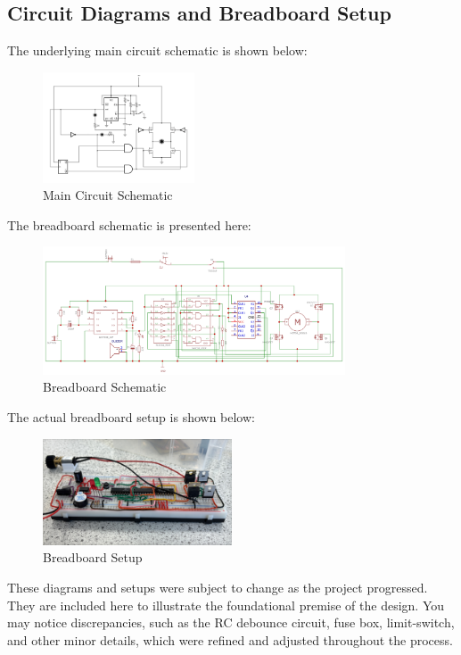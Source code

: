 \documentclass{article}
\begin{document}
\subsection{Circuit Diagrams and Breadboard Setup}
The underlying main circuit schematic is shown below:\vspace{-1em}
\begin{figure}[H]
	\centering
	\includegraphics[width=0.4\textwidth]{images/swappy-20250406-185116.png}\vspace{-1em}
	\caption{Main Circuit Schematic}
\end{figure}
The breadboard schematic is presented here:\vspace{-1em}
\begin{figure}[H]
	\centering
	\includegraphics[width=0.8\textwidth]{images/Schematic_SAKARIYEPCB.sch_2025-04-06_page-0001.jpg}\vspace{-1em}
	\caption{Breadboard Schematic}
\end{figure}
The actual breadboard setup is shown below:
\begin{figure}[H]
	\centering
	\includegraphics[width=0.5\textwidth]{images/Image(2).jpg}
	\caption{Breadboard Setup}
\end{figure}\noindent
These diagrams and setups were subject to change as the project progressed. They are included here to illustrate the foundational premise of the design. You may notice discrepancies, such as the RC debounce circuit, fuse box, limit-switch, and other minor details, which were refined and adjusted throughout the process.
\end{document}
